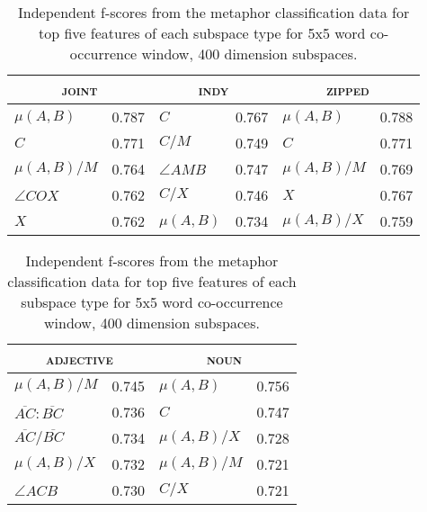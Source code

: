\begin{table}
\centering
\begin{tabular}{lr|lr|lr}
\hline
\multicolumn{2}{c}{\textsc{joint}} & \multicolumn{2}{c}{\textsc{indy}} & \multicolumn{2}{c}{\textsc{zipped}} \\
\hline
$\mu(A,B)$ & 0.787 & $C$ & 0.767 & $\mu(A,B)$ & 0.788 \\
$C$ & 0.771 & $C/M$ & 0.749 & $C$ & 0.771 \\
$\mu(A,B)/M$ & 0.764 & $\angle AMB$ & 0.747 & $\mu(A,B)/M$ & 0.769 \\
$\angle COX$ & 0.762 & $C/X$ & 0.746 & $X$ & 0.767 \\
$X$ & 0.762 & $\mu(A,B)$ & 0.734 & $\mu(A,B)/X$ & 0.759 \\
\hline
\end{tabular}
\vfill
\begin{tabular}{lr|lr}
\multicolumn{2}{c}{\textsc{adjective}} & \multicolumn{2}{c}{\textsc{noun}} \\
\hline
$\mu(A,B)/M$ & 0.745 & $\mu(A,B)$ & 0.756 \\
$\overline{AC}:\overline{BC}$ & 0.736 & $C$ & 0.747 \\
$\overline{AC}/\overline{BC}$ & 0.734 & $\mu(A,B)/X$ & 0.728 \\
$\mu(A,B)/X$ & 0.732 & $\mu(A,B)/M$ & 0.721 \\
$\angle ACB$ & 0.730 & $C/X$ & 0.721 \\
\hline
\end{tabular}
\caption[Top Independent Features for Metaphor Classification]{Independent f-scores from the metaphor classification data for top five features of each subspace type for 5x5 word co-occurrence window, 400 dimension subspaces.}
\label{tab:ind-metaphor}
\end{table}

